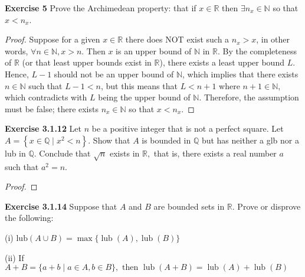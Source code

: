 \documentclass[12pt]{article}
\newcommand{\bbN}{\mathbb{N}}
\newcommand{\bbQ}{\mathbb{Q}}
\newcommand{\bbR}{\mathbb{R}}
\theoremstyle{definition}
\numberwithin{equation}{subsection}
\begin{document}
\textbf{Exercise 5} Prove the Archimedean property: that if 
$x \in \bbR$ then $\exists n_x \in \bbN$ so that
$x < n_x$.
\begin{proof}
Suppose for a given $x \in \bbR$ there does NOT exist such a $n_x > x$, 
in other words, $\forall n \in \bbN, x > n$. Then $x$ is an upper bound of 
$\bbN$ in $\bbR$. By the completeness of $\bbR$ (or that least upper bounds exist in $\bbR$), there exists a least upper bound $L$. Hence, $L - 1$ should not be an upper bound of $\bbN$, which implies that there exists $n \in \bbN$ such that $L-1<n$, but this means that $L < n+1$ where $n+1 \in \bbN$, which contradicts with $L$ being the upper bound of $\bbN$. Therefore, the assumption must be false; there exists $n_x \in \bbN$ so that $x < n_x$.
\end{proof}

\textbf{Exercise 3.1.12} Let $n$ be a positive integer that is not a perfect square.
Let $A=\left\{x \in \mathbb{Q} \mid x^{2}<n\right\} .$ Show that $A$ is bounded in $\bbQ$ but has neither
a glb nor a lub in $\bbQ$. Conclude that $\sqrt{n}$ exists in $\mathbb{R},$ that is, there exists a
real number $a$ such that $a^{2}=n .$
\begin{proof}

\end{proof}


\textbf{Exercise 3.1.14} Suppose that $A$ and $B$ are bounded sets in $\mathbb{R} .$ Prove or
disprove the following:

(i) $\text{lub} (A \cup B)=\max \{\operatorname{lub}(A), \operatorname{lub}(B)\} $

(ii) If $A+B=\{a+b \mid a \in A, b \in B\}, \text { then } \operatorname{lub}(A+B)=\operatorname{lub}(A)+ \operatorname{lub}(B) $
\end{document}
